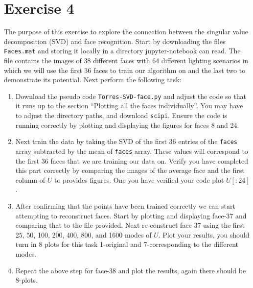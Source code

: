 \section{Exercise 4}
The purpose of this exercise to explore the connection between the singular
value decomposition (SVD) and face recognition. Start by downloading the
files \texttt{Faces.mat} and storing it locally in a directory
jupyter-notebook can read. The file contains the images of 38
different faces with 64 different lighting scenarios in which we will use
the first 36 faces to train our algorithm on and the last two to
demonstrate its potential. Next perform the following task:
\begin{enumerate}[label=\arabic*.]
    \item Download the pseudo code \texttt{Torres-SVD-face.py} and adjust
        the code so that it runs up to the section ``Plotting all the faces
        individually''. You may have to adjust the directory paths, and
        download \texttt{scipi}. Ensure the code is running correctly by
        plotting and displaying the figures for faces 8 and 24.

    \item Next train the data by taking the SVD of the first 36 entries of
        the \texttt{faces} array subtracted by the mean of \texttt{faces}
        array. These values will correspond to the first 36 faces that we
        are training our data on. Verify you have completed this part
        correctly by comparing the images of the average face and the
        first column of $U$ to provides figures. One you have verified your
        code plot $U[:24]$.

    \item After confirming that the points have been trained correctly we
        can start attempting to reconstruct faces. Start by plotting and
        displaying face-37 and comparing that to the file provided. Next
        re-construct face-37 using the first 25, 50, 100, 200, 400, 800,
        and 1600 modes of $U$. Plot your results, you should turn in 8
        plots for this task 1-original and 7-corresponding to the
        different modes. 

    \item Repeat the above step for face-38 and plot the results, again
        there should be 8-plots.

\end{enumerate}

